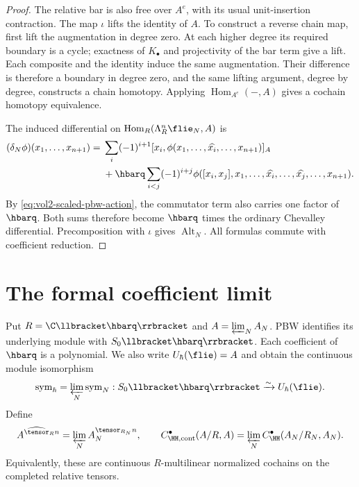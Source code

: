 \begin{proof}
The relative bar is also free over $A^e$, with its usual unit-insertion contraction.
The map $\iota$ lifts the identity of $A$.
To construct a reverse chain map, first lift the augmentation in
degree zero. At each higher degree its required boundary is a cycle;
exactness of $K_\bullet$ and projectivity of the bar term give a lift.
Each composite and the identity induce the same augmentation.
Their difference is therefore a boundary in degree zero, and the same
lifting argument, degree by degree, constructs a chain homotopy.
Applying $\operatorname{Hom}_{A^e}(-,A)$ gives a cochain homotopy equivalence.

The induced differential on
$\operatorname{Hom}_R(\Lambda_R^n\flie_N,A)$ is
\[
\begin{split}
 (\delta_N\phi)(x_1,\ldots,x_{n+1})
 ={}&\sum_i(-1)^{i+1}
 [x_i,\phi(x_1,\ldots,\widehat{x_i},\ldots,x_{n+1})]_A\\
 &+\hbarq\sum_{i<j}(-1)^{i+j}
 \phi([x_i,x_j],x_1,\ldots,\widehat{x_i},
                         \ldots,\widehat{x_j},\ldots,x_{n+1}).
\end{split}
\]
By \eqref{eq:vol2-scaled-pbw-action}, the commutator term also carries
one factor of $\hbarq$. Both sums therefore become $\hbarq$ times the
ordinary Chevalley differential.
Precomposition with $\iota$ gives $\operatorname{Alt}_N$.
All formulas commute with coefficient reduction.
\end{proof}

\section{The formal coefficient limit}
Put $R=\C\llbracket\hbarq\rrbracket$ and $A=\varprojlim_N A_N$.
PBW identifies its underlying module with $S_0\llbracket\hbarq\rrbracket$.
Each coefficient of $\hbarq$ is a polynomial.
We also write $U_\hbar(\flie)=A$ and
obtain the continuous module isomorphism
\[
 \operatorname{sym}_\hbar=\varprojlim_N\operatorname{sym}_N:
 S_0\llbracket\hbarq\rrbracket\xrightarrow{\sim}U_\hbar(\flie).
\]
Define
\[
 A^{\widehat\tensor_R n}=\varprojlim_N A_N^{\tensor_{R_N}n},
 \qquad
 C^\bullet_{\HH,\mathrm{cont}}(A/R,A)
 =\varprojlim_N C^\bullet_{\HH}(A_N/R_N,A_N).
\]
Equivalently, these are continuous $R$-multilinear normalized cochains
on the completed relative tensors.

